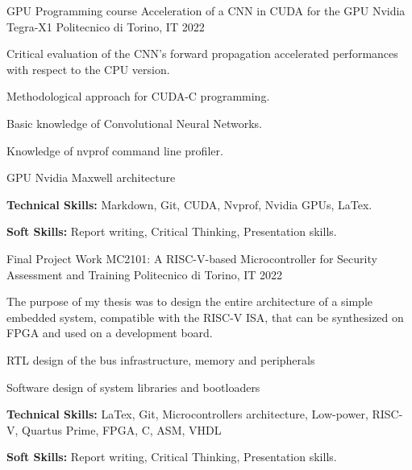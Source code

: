 \begin{cventries}
  \cventry
    {GPU Programming course} %
    {Acceleration of a CNN in CUDA for the GPU Nvidia Tegra-X1} %
    {Politecnico di Torino, IT} %
    {2022} %
    {
      \begin{cvitems} %
        \item {Critical evaluation of the CNN's forward propagation accelerated performances with respect to the CPU version.}
        \item {Methodological approach for CUDA-C programming.}
        \item {Basic knowledge of Convolutional Neural Networks.}
        \item {Knowledge of nvprof command line profiler.}
        \item {GPU Nvidia Maxwell architecture}
        \item {\textbf{Technical Skills:} Markdown, Git, CUDA, Nvprof, Nvidia GPUs, LaTex.}
        \item {\textbf{Soft Skills:} Report writing, Critical Thinking, Presentation skills.}
      \end{cvitems}
    }

  \cventry
    {Final Project Work} %
    {MC2101: A RISC-V-based Microcontroller for Security Assessment and Training} %
    {Politecnico di Torino, IT} %
    {2022} %
    {
      \begin{cvitems} %
        \item {The purpose of my thesis was to design the entire architecture of a simple embedded system, compatible with the RISC-V ISA, that can be synthesized on FPGA and used on a development board.}
        \item{RTL design of the bus infrastructure, memory and peripherals}
        \item{Software design of system libraries and bootloaders}
        \item {\textbf{Technical Skills:} LaTex, Git, Microcontrollers architecture, Low-power, RISC-V, Quartus Prime, FPGA, C, ASM, VHDL}
        \item {\textbf{Soft Skills:} Report writing, Critical Thinking, Presentation skills.}
      \end{cvitems}
    }

\end{cventries}

